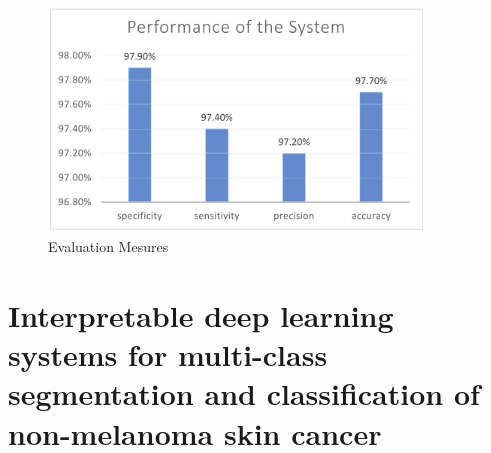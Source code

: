 \begin{figure}[htbp]
\begin{center}
\includegraphics[width=10cm]{./chapter-03-state-of-the-art/evaluation.png}
\end{center}
\caption{Evaluation Mesures}
\label{fig:evaluation}
\end{figure}









\section{Interpretable deep learning systems for multi-class segmentation and classification of non-melanoma skin cancer}


